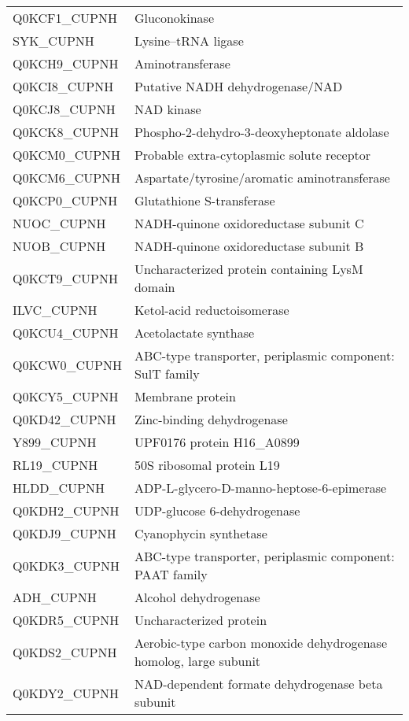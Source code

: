 \begin{center}
\begin{longtable}{ l l }
Q0KCF1\_CUPNH & Gluconokinase \\ [0.5ex]
SYK\_CUPNH & Lysine--tRNA ligase \\ [0.5ex]
Q0KCH9\_CUPNH & Aminotransferase \\ [0.5ex]
Q0KCI8\_CUPNH & Putative NADH dehydrogenase/NAD \\ [0.5ex]
Q0KCJ8\_CUPNH & NAD kinase \\ [0.5ex]
Q0KCK8\_CUPNH & Phospho-2-dehydro-3-deoxyheptonate aldolase \\ [0.5ex]
Q0KCM0\_CUPNH & Probable extra-cytoplasmic solute receptor \\ [0.5ex]
Q0KCM6\_CUPNH & Aspartate/tyrosine/aromatic aminotransferase \\ [0.5ex]
Q0KCP0\_CUPNH & Glutathione S-transferase \\ [0.5ex]
NUOC\_CUPNH & NADH-quinone oxidoreductase subunit C \\ [0.5ex]
NUOB\_CUPNH & NADH-quinone oxidoreductase subunit B \\ [0.5ex]
Q0KCT9\_CUPNH & Uncharacterized protein containing LysM domain \\ [0.5ex]
ILVC\_CUPNH & Ketol-acid reductoisomerase \\ [0.5ex]
Q0KCU4\_CUPNH & Acetolactate synthase \\ [0.5ex]
Q0KCW0\_CUPNH & ABC-type transporter, periplasmic component: SulT family \\ [0.5ex]
Q0KCY5\_CUPNH & Membrane protein \\ [0.5ex]
Q0KD42\_CUPNH & Zinc-binding dehydrogenase \\ [0.5ex]
Y899\_CUPNH & UPF0176 protein H16\_A0899 \\ [0.5ex]
RL19\_CUPNH & 50S ribosomal protein L19 \\ [0.5ex]
HLDD\_CUPNH & ADP-L-glycero-D-manno-heptose-6-epimerase \\ [0.5ex]
Q0KDH2\_CUPNH & UDP-glucose 6-dehydrogenase \\ [0.5ex]
Q0KDJ9\_CUPNH & Cyanophycin synthetase \\ [0.5ex]
Q0KDK3\_CUPNH & ABC-type transporter, periplasmic component: PAAT family \\ [0.5ex]
ADH\_CUPNH & Alcohol dehydrogenase \\ [0.5ex]
Q0KDR5\_CUPNH & Uncharacterized protein \\ [0.5ex]
Q0KDS2\_CUPNH & Aerobic-type carbon monoxide dehydrogenase homolog, large subunit \\ [0.5ex]
Q0KDY2\_CUPNH & NAD-dependent formate dehydrogenase beta subunit \\ [0.5ex]

\end{longtable}
\end{center}
